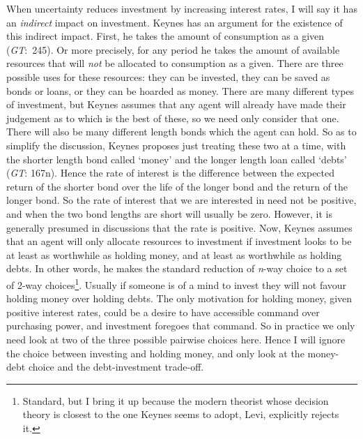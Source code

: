 \documentclass[
  10pt,
  letterpaper,
  DIV=11,
  numbers=noendperiod,
  twoside]{scrartcl}
\begin{document}
When uncertainty reduces investment by increasing interest rates, I will
say it has an \emph{indirect} impact on investment. Keynes has an
argument for the existence of this indirect impact. First, he takes the
amount of consumption as a given (\emph{GT}:~245). Or more precisely,
for any period he takes the amount of available resources that will
\emph{not} be allocated to consumption as a given. There are three
possible uses for these resources: they can be invested, they can be
saved as bonds or loans, or they can be hoarded as money. There are many
different types of investment, but Keynes assumes that any agent will
already have made their judgement as to which is the best of these, so
we need only consider that one. There will also be many different length
bonds which the agent can hold. So as to simplify the discussion, Keynes
proposes just treating these two at a time, with the shorter length bond
called `money' and the longer length loan called `debts' (\emph{GT}:
167n). Hence the rate of interest is the difference between the expected
return of the shorter bond over the life of the longer bond and the
return of the longer bond. So the rate of interest that we are
interested in need not be positive, and when the two bond lengths are
short will usually be zero. However, it is generally presumed in
discussions that the rate is positive. Now, Keynes assumes that an agent
will only allocate resources to investment if investment looks to be at
least as worthwhile as holding money, and at least as worthwhile as
holding debts. In other words, he makes the standard reduction of
\emph{n}-way choice to a set of 2-way choices\footnote{Standard, but I
  bring it up because the modern theorist whose decision theory is
  closest to the one Keynes seems to adopt, Levi, explicitly rejects it.}.
Usually if someone is of a mind to invest they will not favour holding
money over holding debts. The only motivation for holding money, given
positive interest rates, could be a desire to have accessible command
over purchasing power, and investment foregoes that command. So in
practice we only need look at two of the three possible pairwise choices
here. Hence I will ignore the choice between investing and holding
money, and only look at the money-debt choice and the debt-investment
trade-off.
\end{document}
